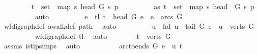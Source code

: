 \begin{isabellebody}
\ \ \ \ \ \ \isamarkupfalse%
\ {\isachardoublequoteopen}{\isasymnot}\ t\ {\isasymnotin}\ {\isacharparenleft}{\kern0pt}set\ {\isacharparenleft}{\kern0pt}\ map\ {\isacharparenleft}{\kern0pt}{\isasymlambda}s{\isachardot}{\kern0pt}\ {\isacharparenleft}{\kern0pt}head\ G\ s{\isacharparenright}{\kern0pt}{\isacharparenright}{\kern0pt}\ p{\isacharparenright}{\kern0pt}{\isacharparenright}{\kern0pt}{\isachardoublequoteclose}\isanewline
\ \ \ \ \ \ \isamarkupfalse%
\ \isamarkupfalse%
\ as{\isacharcolon}{\kern0pt}\ {\isachardoublequoteopen}t\ {\isasymin}\ {\isacharparenleft}{\kern0pt}set\ {\isacharparenleft}{\kern0pt}\ map\ {\isacharparenleft}{\kern0pt}{\isasymlambda}s{\isachardot}{\kern0pt}\ {\isacharparenleft}{\kern0pt}head\ \ G\ s{\isacharparenright}{\kern0pt}{\isacharparenright}{\kern0pt}\ p{\isacharparenright}{\kern0pt}{\isacharparenright}{\kern0pt}{\isachardoublequoteclose}\isanewline
\ \ \ \ \ \ \ \ \isamarkupfalse%
\ auto\isanewline
\ \ \ \ \ \ \isamarkupfalse%
\ \isamarkupfalse%
\ e\ \ tl{\isacharcolon}{\kern0pt}\ {\isachardoublequoteopen}t\ {\isacharequal}{\kern0pt}\ {\isacharparenleft}{\kern0pt}head\ G\ e{\isacharparenright}{\kern0pt}\ {\isasymand}\ e\ {\isasymin}\ arcs\ G{\isachardoublequoteclose}\isanewline
\ \ \ \ \ \ \ \ \isamarkupfalse%
\ wf{\isacharunderscore}{\kern0pt}digraph{\isacharunderscore}{\kern0pt}def\ awalk{\isacharunderscore}{\kern0pt}def\ path\ \isamarkupfalse%
\ auto\isanewline
\ \ \ \ \ \ \isamarkupfalse%
\ \isamarkupfalse%
\ u\ \ hd{\isacharcolon}{\kern0pt}\ {\isachardoublequoteopen}u\ {\isacharequal}{\kern0pt}\ {\isacharparenleft}{\kern0pt}tail\ G\ e{\isacharparenright}{\kern0pt}\ {\isasymand}\ u\ {\isasymin}\ verts\ G{\isachardoublequoteclose}\isanewline
\ \ \ \ \ \ \ \ \isamarkupfalse%
\ wf{\isacharunderscore}{\kern0pt}digraph{\isacharunderscore}{\kern0pt}def\ tl\ \isamarkupfalse%
\ auto\isanewline
\ \ \ \ \ \ \isamarkupfalse%
\ {\isachardoublequoteopen}t\ {\isasymin}\ verts\ G{\isachardoublequoteclose}\isanewline
\ \ \ \ \ \ \ \ \isamarkupfalse%
\ assms{\isacharparenleft}{\kern0pt}{}{\isacharparenright}{\kern0pt}\ is{\isacharunderscore}{\kern0pt}tip{\isachardot}{\kern0pt}simps\ \isamarkupfalse%
\ auto\ \isanewline
\ \ \ \ \ \ \isamarkupfalse%
\ \isamarkupfalse%
\ {\isachardoublequoteopen}arc{\isacharunderscore}{\kern0pt}to{\isacharunderscore}{\kern0pt}ends\ G\ e\ {\isacharequal}{\kern0pt}\ {\isacharparenleft}{\kern0pt}u{\isacharcomma}{\kern0pt}\ t{\isacharparenright}{\kern0pt}{\isachardoublequoteclose}\ \isamarkupfalse%

\end{isabellebody}
